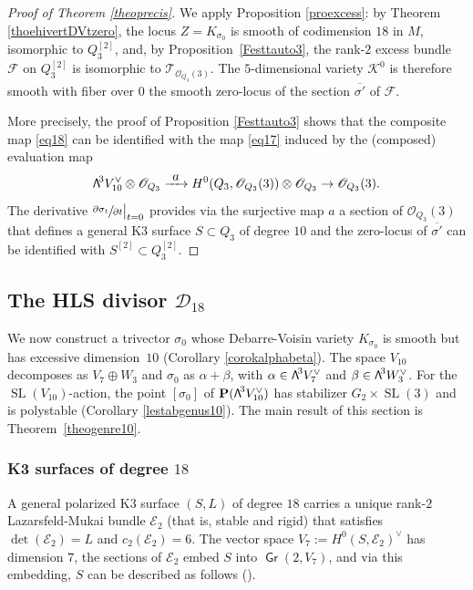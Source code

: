 \documentclass[11pt]{article}
\let\mathcal\mathscr
\newcommand\To[1]{\mathchoice{\xrightarrow{\textstyle\kern4pt#1\kern3pt}}{\stackrel{#1}{\longrightarrow}}{}{}}
\theoremstyle{definition}
\renewcommand\P{{\mathbf P}}\let\PP\P
\newcommand\cD{\mathcal{D}}
\newcommand\cE{\mathcal{E}}
\newcommand\cF{\mathcal{F}}
\newcommand\cK{\mathcal{K}}
\newcommand\cO{\mathcal{O}}\let\OO\cO
\newcommand\cT{\mathcal{T}}
\DeclareMathOperator{\Gr}{\mathsf{Gr}}
\DeclareMathOperator{\SL}{SL}
\newcommand\bw[1]{{\hbox{\large$\mathsf{\Lambda}$}^{\!#1}}}
\newcommand\Qtrois{{Q_3}}
\newcommand\hilb{{Q_3^{[2]}}}
\newcommand\hilbS{S^{[2]}}
\begin{document}
\begin{proof}[Proof of Theorem \ref{theoprecis}]
We apply Proposition \ref{proexcess}:
by Theorem \ref{thoehivertDVtzero},
the locus \hbox{$Z=K_{\sigma_0}$} is smooth of codimension $18$ in $M$, isomorphic to
$\hilb$, and, by Proposition~\ref{Festtauto3}, the rank-$2$ excess
bundle~$\cF $ on $\hilb$ is isomorphic to
$\cT_{\cO_{Q_3}(3)}$. The $5$-dimensional variety $\cK^0$ is therefore smooth
with fiber over $0$ the smooth zero-locus of the
section $\overline {\sigma'} $ of $\cF$.

More precisely, the proof of
Proposition \ref{Festtauto3} shows that the composite
map \eqref{eq18} can be
identified with the map \eqref{eq17}
induced by
the (composed) evaluation map
\[
\bw3V_{10}^\vee\otimes \cO_{\Qtrois}\To{a} H^0(\Qtrois,\cO_{Q_3}(3))\otimes \cO_{\Qtrois}\to \cO_{\Qtrois}(3).
\]
The derivative $\sfrac{\partial\sigma_t}{\partial t}\big\vert_{t=0} $ provides via the surjective map $a$ a section
of $ \cO_{\Qtrois}(3) $ that defines a general K3 surface $S\subset \Qtrois$ of degree $10$ and the zero-locus of $\overline {\sigma'} $ can be identified with $\hilbS\subset Q_3^{[2]}$.
\end{proof}

\subsection{The HLS divisor $\cD_{18}$}\label{secpf10}
We now construct a trivector $\sigma_0$ whose
Debarre-Voisin variety $K_{\sigma_0}$ is smooth but has excessive dimension~$10$ (Corollary \ref{corokalphabeta}). The space $V_{10}$ decomposes as $V_7\oplus W_3$ and
$\sigma_0$ as $\alpha+\beta$, with $\alpha\in \bw3V_7^\vee$ and $\beta\in \bw3W_3^\vee$. For the $\SL(V_{10})$-action, the point $[\sigma_0]$ of $\P(\bw3V_{10}^\vee)$ has stabilizer
$G_2 {\times} \SL(3)$ and is polystable (Corollary \ref{lestabgenus10}). The main result of this section is Theorem~\ref{theogenre10}.

\subsubsection{K3 surfaces of degree $18$}\label{secgenre10}
A general polarized K3 surface $(S,L)$ of degree $18$ carries a unique rank-$2$ Lazarsfeld-Mukai
bundle $\cE_2$ (that is, stable and rigid) that satisfies $\det(\cE_2)=L$ and $c_2(\cE_2)=6$. The vector space
$V_7:=H^0(S,\cE_2 )^\vee$ has dimension $7$, the sections of $\cE_2 $ embed $S$ into $\Gr(2,V_7)$, and
via this embedding, $S$
can be described as follows (\cite{mukai}).
\end{document}
